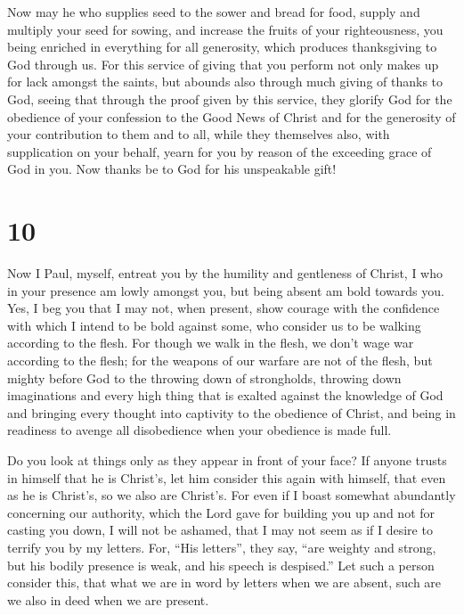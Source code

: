  Now may he who supplies seed to the sower and bread for
food, supply and multiply your seed for sowing, and increase the fruits
of your righteousness,  you being enriched in everything
for all generosity, which produces thanksgiving to God through us.
 For this service of giving that you perform not only
makes up for lack amongst the saints, but abounds also through much
giving of thanks to God,  seeing that through the proof
given by this service, they glorify God for the obedience of your
confession to the Good News of Christ and for the generosity of your
contribution to them and to all,  while they themselves
also, with supplication on your behalf, yearn for you by reason of the
exceeding grace of God in you.  Now thanks be to God for
his unspeakable gift!

\hypertarget{section-9}{%
\section{10}\label{section-9}}

 Now I Paul, myself, entreat you by the humility and
gentleness of Christ, I who in your presence am lowly amongst you, but
being absent am bold towards you.  Yes, I beg you that I
may not, when present, show courage with the confidence with which I
intend to be bold against some, who consider us to be walking according
to the flesh.  For though we walk in the flesh, we don't
wage war according to the flesh;  for the weapons of our
warfare are not of the flesh, but mighty before God to the throwing down
of strongholds,  throwing down imaginations and every high
thing that is exalted against the knowledge of God and bringing every
thought into captivity to the obedience of Christ,  and
being in readiness to avenge all disobedience when your obedience is
made full.

 Do you look at things only as they appear in front of
your face? If anyone trusts in himself that he is Christ's, let him
consider this again with himself, that even as he is Christ's, so we
also are Christ's.  For even if I boast somewhat
abundantly concerning our authority, which the Lord gave for building
you up and not for casting you down, I will not be ashamed,
 that I may not seem as if I desire to terrify you by my
letters.  For, ``His letters'', they say, ``are weighty
and strong, but his bodily presence is weak, and his speech is
despised.''  Let such a person consider this, that what
we are in word by letters when we are absent, such are we also in deed
when we are present.

